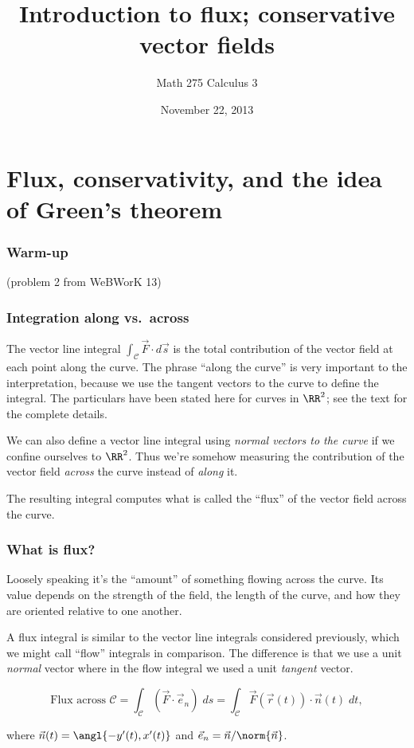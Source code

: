 \documentclass[11pt,ignorenonframetext,aspectratio=169,xcolor={svgnames}]{beamer}
\title{Introduction to flux; conservative vector fields}
\author{Math 275 Calculus 3}
\date{November 22, 2013}
\begin{document}
\frame{\titlepage}

\section{Flux, conservativity, and the idea of Green's theorem}

\begin{frame}\frametitle{Warm-up}

(problem 2 from WeBWorK 13)

\end{frame}

\begin{frame}\frametitle{Integration along vs.~across}

The vector line integral $\int_{\mathcal{C}} \vec{F} \cdot d\vec{s}$ is
the total contribution of the vector field at each point along the
curve. The phrase ``along the curve'' is very important to the
interpretation, because we use the tangent vectors to the curve to
define the integral. The particulars have been stated here for curves in
$\RR^2$; see the text for the complete details.

We can also define a vector line integral using \emph{normal vectors to
the curve} if we confine ourselves to $\RR^2$. Thus we're somehow
measuring the contribution of the vector field \emph{across} the curve
instead of \emph{along} it.

The resulting integral computes what is called the ``flux'' of the
vector field across the curve.

\end{frame}

\begin{frame}\frametitle{What is flux?}

Loosely speaking it's the ``amount'' of something flowing across the
curve. Its value depends on the strength of the field, the length of the
curve, and how they are oriented relative to one another.

A flux integral is similar to the vector line integrals considered
previously, which we might call ``flow'' integrals in comparison. The
difference is that we use a unit \emph{normal} vector where in the flow
integral we used a unit \emph{tangent} vector.

\begin{equation*}
    \text{Flux across $\mathcal{C}$} = \int_{\mathcal{C}} (\vec{F} \cdot \vec{e}_n) \; ds = \int_{\mathcal{C}} \vec{F}(\vec{r}(t)) \cdot \vec{n}(t) \; dt,
\end{equation*}

where $\vec{n}(t) = \angl{-y'(t), x'(t)}$ and
$\vec{e}_n = \vec{n}/\norm{\vec{n}}$.

\end{frame}
\end{document}
